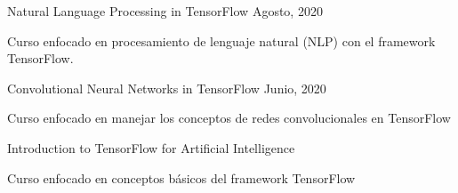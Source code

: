 \begin{cventries}
{\begin{cvitems}
    \end{cvitems}
  }
  \newline
  \cventry
  {Natural Language Processing in TensorFlow} %
  {} %
  {} %
  {Agosto, 2020} %
  {
    \begin{cvitems} %
      \item {Curso enfocado en procesamiento de lenguaje natural (NLP) con el framework TensorFlow.}
    \end{cvitems}
  }
  \newline

  \cventry
  {Convolutional Neural Networks in TensorFlow} %
  {} %
  {} %
  {Junio, 2020} %
  {
    \begin{cvitems} %
      \item {Curso enfocado en manejar los conceptos de redes convolucionales en TensorFlow}
    \end{cvitems}
  }
  \newline

  \cventry
  {Introduction to TensorFlow for Artificial Intelligence} %
  {} %
  {} %
  {} %
  {
    \begin{cvitems} %
      \item {Curso enfocado en conceptos básicos del framework TensorFlow}
    \end{cvitems}
  }
  \newline

\end{cventries}